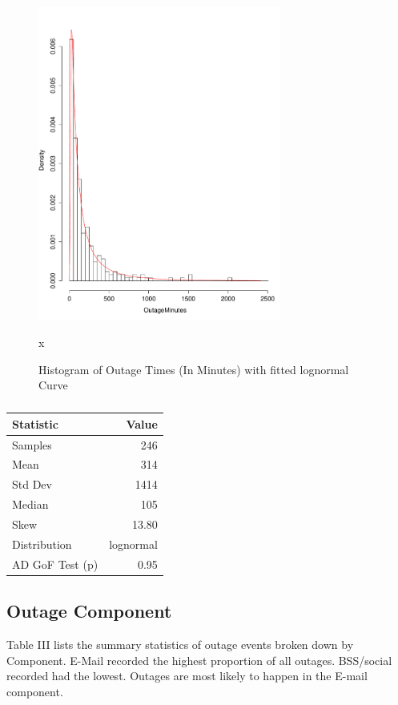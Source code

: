 \begin{figure}
\begin{center}
\includegraphics[width=8cm]{graphs/service/graph1.pdf} 
\caption{ Histogram of Outage Times (In Minutes) with fitted lognormal Curve}
\end{center}
\label{fig:outagedistribution}x
\end{figure}


\begin {table}
\caption{}
\begin{center}
\begin{tabular}{l | r} Statistic & Value 
\\ \hline Samples & 246
\\ Mean & 314
\\ Std Dev & 1414
\\ Median & 105
\\ Skew & 13.80
\\ Distribution & lognormal
\\AD GoF Test (p) & 0.95
\end{tabular}
\end{center}
\end{table}


\subsection{Outage Component}

Table III lists the summary statistics of outage events broken down by Component. E-Mail recorded the highest proportion of all outages. BSS/social recorded had the lowest. Outages are most likely to happen in the E-mail component. \par

